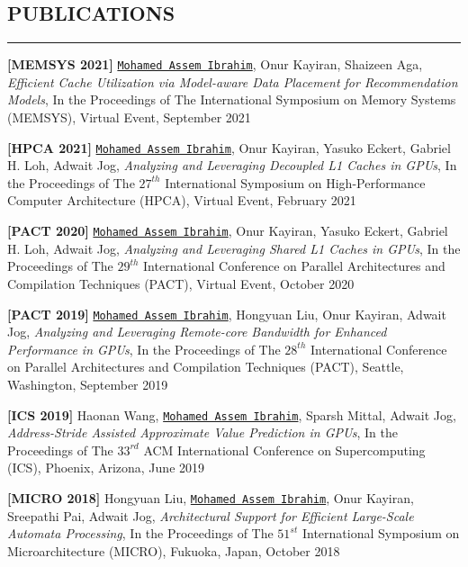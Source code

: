 \documentclass[10pt,a4]{article}
\begin{document}
\subsection*{PUBLICATIONS}
\hrule
\vspace{0.2cm}

\begin{description}
\item 
{\bf [MEMSYS 2021]}
{\tt \underline{Mohamed Assem Ibrahim}}, Onur Kayiran, Shaizeen Aga,
{\it Efficient Cache Utilization via Model-aware Data Placement for Recommendation Models},
In the Proceedings of The International Symposium on Memory Systems (MEMSYS),  
Virtual Event, September 2021

\item 
{\bf [HPCA 2021]}
{\tt \underline{Mohamed Assem Ibrahim}}, Onur Kayiran, Yasuko Eckert, Gabriel H. Loh, Adwait Jog,
{\it Analyzing and Leveraging Decoupled L1 Caches in GPUs},
In the Proceedings of The $27^{th}$ International Symposium on High-Performance Computer Architecture (HPCA),  
Virtual Event, February 2021

\item 
{\bf [PACT 2020]}
{\tt \underline{Mohamed Assem Ibrahim}}, Onur Kayiran, Yasuko Eckert, Gabriel H. Loh, Adwait Jog,
{\it Analyzing and Leveraging Shared L1 Caches in GPUs},
In the Proceedings of The $29^{th}$ International Conference on Parallel Architectures and Compilation Techniques (PACT), 
Virtual Event, October 2020

\item 
{\bf [PACT 2019]}
{\tt \underline{Mohamed Assem Ibrahim}}, Hongyuan Liu, Onur Kayiran, Adwait Jog,
{\it Analyzing and Leveraging Remote-core Bandwidth for Enhanced Performance in GPUs},
In the Proceedings of The $28^{th}$ International Conference on Parallel Architectures and Compilation Techniques (PACT), 
Seattle, Washington, September 2019

\item 
{\bf [ICS 2019]}
Haonan Wang, {\tt \underline{Mohamed Assem Ibrahim}}, Sparsh Mittal, Adwait Jog, 
{\it Address-Stride Assisted Approximate Value Prediction in GPUs},
In the Proceedings of The $33^{rd}$ ACM International Conference on Supercomputing (ICS), 
Phoenix, Arizona, June 2019

\item 
{\bf [MICRO 2018]}
Hongyuan Liu, {\tt \underline{Mohamed Assem Ibrahim}}, Onur Kayiran, Sreepathi Pai, Adwait Jog, 
{\it Architectural Support for Efficient Large-Scale Automata Processing},
In the Proceedings of The $51^{st}$ International Symposium on Microarchitecture (MICRO), 
Fukuoka, Japan, October 2018


\end{description}
\end{document}

